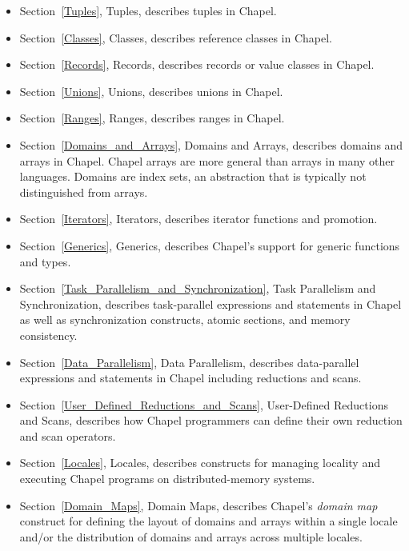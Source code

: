 \begin{itemize}
\item
Section~\ref{Tuples}, Tuples, describes tuples in Chapel.

\item
Section~\ref{Classes}, Classes, describes reference classes in Chapel.

\item
Section~\ref{Records}, Records, describes records or value classes in
Chapel.

\item
Section~\ref{Unions}, Unions, describes unions in Chapel.

\item
Section~\ref{Ranges}, Ranges, describes ranges in Chapel.

\item
Section~\ref{Domains_and_Arrays}, Domains and Arrays, describes
domains and arrays in Chapel.  Chapel arrays are more general than
arrays in many other languages.  Domains are index sets, an
abstraction that is typically not distinguished from arrays.

\item
Section~\ref{Iterators}, Iterators, describes iterator functions and
promotion.

\item
Section~\ref{Generics}, Generics, describes Chapel's support for
generic functions and types.

\item
Section~\ref{Task_Parallelism_and_Synchronization}, Task Parallelism
and Synchronization, describes task-parallel expressions and
statements in Chapel as well as synchronization constructs, atomic
sections, and memory consistency.

\item
Section~\ref{Data_Parallelism}, Data Parallelism, describes
data-parallel expressions and statements in Chapel including
reductions and scans.

\item
Section~\ref{User_Defined_Reductions_and_Scans}, User-Defined
Reductions and Scans, describes how Chapel programmers can define
their own reduction and scan operators.

\item
Section~\ref{Locales}, Locales, describes constructs for managing
locality and executing Chapel programs on distributed-memory systems.

\item
Section~\ref{Domain_Maps}, Domain Maps, describes
Chapel's \emph{domain map} construct for defining the layout of
domains and arrays within a single locale and/or the distribution of
domains and arrays across multiple locales.


\end{itemize}
